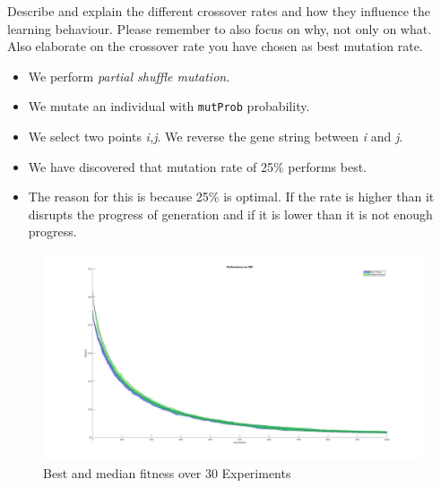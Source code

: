 \documentclass[a4paper, 12pt]{article}
\begin{document}
Describe and explain the different crossover rates and how they influence the learning behaviour. Please remember to also focus on why, not only on what.
Also elaborate on the crossover rate you have chosen as best mutation rate.
\begin{itemize}
    \item We perform \textit{partial shuffle mutation}.
    \item We mutate an individual with \texttt{mutProb} probability.
    \item We select two points \textit{i,j}. We reverse the gene string between \textit{i} and \textit{j}.
    \item We have discovered that mutation rate of 25\% performs best.
    \item The reason for this is because 25\% is optimal. If the rate is higher than it disrupts the progress of generation and if it is lower than it is not enough progress.
\end{itemize}

\begin{figure}[ht!]
  \centering
  \includegraphics[width=1.0\textwidth]{images/1000X30_updated.jpg}
  \caption{Best and median fitness over 30 Experiments\label{fig:mutfig}}
\end{figure}
\end{document}

